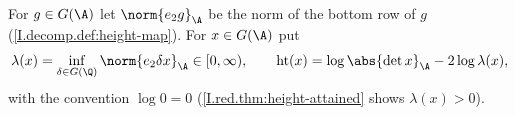 For $g\in G(\A)$ let $\norm{e_2g}_\A$ be the norm of the bottom row of $g$ (\cref{I.decomp.def:height-map}). For
$x\in G(\A)$ put
\[
  \lambda(x)=\inf_{\delta\in G(\Q)}\norm{e_2\delta x}_\A\in[0,\infty),\qquad
  \operatorname{ht}(x)=\log\abs{\det x}_\A-2\log\lambda(x),
\]
with the convention $\log0=0$ (\cref{I.red.thm:height-attained} shows $\lambda(x)>0$).
